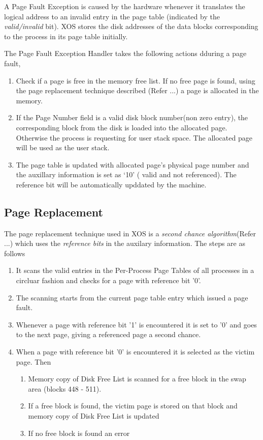 \documentclass[10pt]{report}
\begin{document}
A Page Fault Exception is caused by the hardware whenever it translates the logical address to an invalid entry in the page table (indicated by the \textit{valid/invalid} bit). XOS stores the disk addresses of the data blocks corresponding to the process in its page table initially. 

The Page Fault Exception Handler takes the following actions dduring a page fault,
\begin{enumerate}
\item Check if a page is free in the memory free list. If no free page is found, using the page replacement technique described (Refer ...) a page is allocated in the memory.
\item If the Page Number field is a valid disk block number(non zero entry), the corresponding block from the disk is loaded into the allocated page. Otherwise the process is requesting for user stack space. The allocated page will be used as the user stack.
\item The page table is updated with allocated page's physical page number and the auxillary information is set as `10' ( valid and not referenced). The reference bit will be automatically upddated by the machine.
\end{enumerate}

\subsection{Page Replacement}

The page replacement technique used in XOS is a \textit{second chance algorithm}(Refer ...) which uses the \textit{reference bits} in the auxilary information. The steps are as follows

\begin{enumerate}
\item It scans the valid entries in the  Per-Process Page Tables of all processes in a circluar fashion and checks for a page with reference bit '0'.
\item The scanning starts from the current page table entry which issued a page fault.
\item Whenever a page with reference bit '1' is encountered it is set to '0' and goes to the next page, giving a referenced page a second chance.
\item When a page with reference bit '0' is encountered it is selected as the victim page. Then
	\begin{enumerate}
		\item Memory copy of Disk Free List is scanned for a free block in the swap area (blocks 448 - 511).
		\item If a free block is found, the victim page is stored on that block and memory copy of Disk Free List is updated 	
		\item If no free block is found an error  
		
	\end{enumerate}	   

\end{enumerate}
\end{document}
